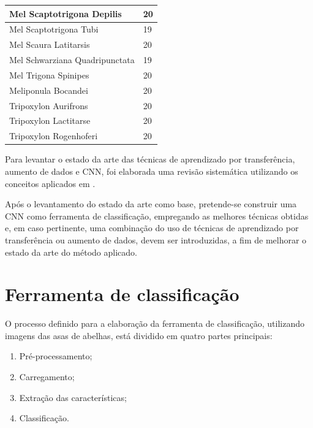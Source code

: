 \documentclass[
	12pt,				%
	oneside,			%
	a4paper,			%
	english,			%
	brazil				%
	]{abntex2ppgsi}
\begin{document}
\begin{longtable}[c]{|l|l|}
Mel Scaptotrigona Depilis       & 20                                         \\ \hline
Mel Scaptotrigona Tubi          & 19                                         \\ \hline
Mel Scaura Latitarsis           & 20                                         \\ \hline
Mel Schwarziana Quadripunctata  & 19                                         \\ \hline
Mel Trigona Spinipes            & 20                                         \\ \hline
Meliponula Bocandei             & 20                                         \\ \hline
Tripoxylon Aurifrons            & 20                                         \\ \hline
Tripoxylon Lactitarse           & 20                                         \\ \hline
Tripoxylon Rogenhoferi          & 20                                         \\ \hline
\end{longtable}

Para levantar o estado da arte das técnicas de aprendizado por transferência, aumento de dados e CNN, foi elaborada uma revisão sistemática utilizando os conceitos aplicados em .

Após o levantamento do estado da arte como base, pretende-se construir uma CNN como ferramenta de classificação, empregando as melhores técnicas obtidas e, em caso pertinente, uma combinação do uso de técnicas de aprendizado por transferência ou aumento de dados, devem ser introduzidas, a fim de melhorar o estado da arte do método aplicado.

\section{Ferramenta de classificação}
O processo definido para a elaboração da ferramenta de classificação, utilizando imagens das asas de abelhas, está dividido em quatro partes principais:

\begin{enumerate}
  \item Pré-processamento;
  \item Carregamento;
  \item Extração das características;
  \item Classificação.
\end{enumerate}
\end{document}
